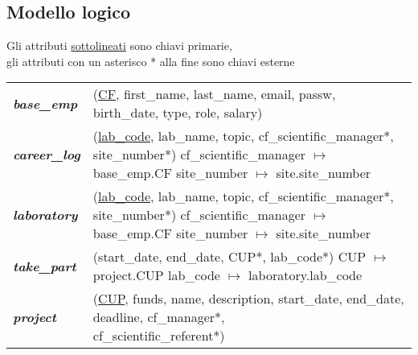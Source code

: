 \newpage
\subsection{Modello logico}
Gli attributi \underline{sottolineati} sono chiavi primarie,\\
gli attributi con un asterisco * alla fine sono chiavi esterne\meskip
\begin{tabular}{@{}l l}
	\textbf{\textit{base\_emp}}          & (\underline{CF}, first\_name, last\_name, email, passw, birth\_date, type, role, salary)                  \\
	\textbf{\textit{career\_log}}        & \makecell[lt]{(\underline{lab\_code}, lab\_name, topic, cf\_scientific\_manager*, site\_number*)          \\
	cf\_scientific\_manager $\mapsto$ base\_emp.CF                                                                                                   \\
	site\_number $\mapsto$ site.site\_number}                                                                                                        \\
	\textbf{\textit{laboratory}}         & \makecell[lt]{(\underline{lab\_code}, lab\_name, topic, cf\_scientific\_manager*, site\_number*)          \\
	cf\_scientific\_manager $\mapsto$ base\_emp.CF                                                                                                   \\
	site\_number $\mapsto$ site.site\_number}                                                                                                        \\
	\textbf{\textit{take\_part}}         & \makecell[lt]{(start\_date, end\_date, CUP*, lab\_code*)                                                  \\
	CUP $\mapsto$ project.CUP                                                                                                                        \\
	lab\_code $\mapsto$ laboratory.lab\_code}                                                                                                        \\
	\textbf{\textit{project}}            & \makecell[lt]{(\underline{CUP}, funds, name, description, start\_date, end\_date, deadline, cf\_manager*, \\
	cf\_scientific\_referent*)                                                                                                                       \\
}
\end{tabular}
